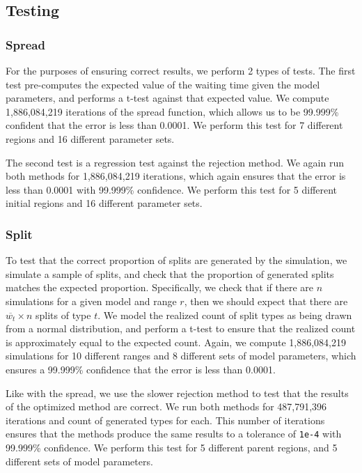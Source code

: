 \documentclass[a4paper]{article}
\begin{document}
\subsection{Testing}

\subsubsection{Spread}

For the purposes of ensuring correct results, we perform 2 types of tests.
The first test pre-computes the expected value of the waiting time given the
model parameters, and performs a t-test against that expected value.
We compute 1,886,084,219 iterations of the spread function, which allows us to
be 99.999\% confident that the error is less than 0.0001.
We perform this test for 7 different regions and 16 different parameter sets.

The second test is a regression test against the rejection method.
We again run both methods for 1,886,084,219 iterations, which again ensures
that the error is less than 0.0001 with 99.999\% confidence.
We perform this test for 5 different initial regions and 16 different parameter
sets.

\subsubsection{Split}

To test that the correct proportion of splits are generated by the simulation,
we simulate a sample of splits, and check that the proportion of generated
splits matches the expected proportion.
Specifically, we check that if there are \(n\) simulations for a given model
and range \( r \), then we should expect that there are \(\overline{w_t} \times
n\) splits of type \( t \).
We model the realized count of split types as being drawn from a normal
distribution, and perform a t-test to ensure that the realized count is
approximately equal to the expected count.
Again, we compute 1,886,084,219 simulations for 10 different ranges and 8
different sets of model parameters, which ensures a 99.999\% confidence that
the error is less than 0.0001.

Like with the spread, we use the slower rejection method to test that the
results of the optimized method are correct.
We run both methods for 487,791,396 iterations and count of generated types for
each.
This number of iterations ensures that the methods produce the same results to
a tolerance of \texttt{1e-4} with 99.999\% confidence.
We perform this test for 5 different parent regions, and 5 different sets of
model parameters.
\end{document}
